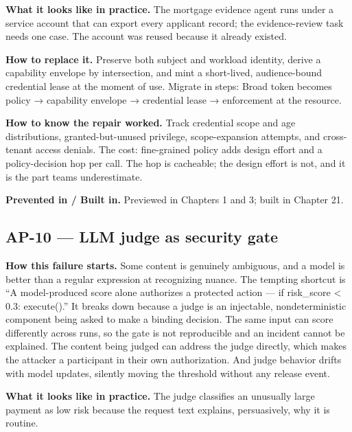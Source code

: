 \textbf{What it looks like in practice.} The mortgage evidence agent runs under a service account that can export every applicant record; the evidence-review task needs one case. The account was reused because it already existed.\par

\textbf{How to replace it.} Preserve both subject and workload identity, derive a capability envelope by intersection, and mint a short-lived, audience-bound credential lease at the moment of use. Migrate in steps: Broad token becomes policy → capability envelope → credential lease → enforcement at the resource.\par

\textbf{How to know the repair worked.} Track credential scope and age distributions, granted-but-unused privilege, scope-expansion attempts, and cross-tenant access denials. The cost: fine-grained policy adds design effort and a policy-decision hop per call. The hop is cacheable; the design effort is not, and it is the part teams underestimate.\par

\textbf{Prevented in / Built in.} Previewed in Chapters 1 and 3; built in Chapter 21.\par

\subsection{AP-10 — LLM judge as security gate}

\textbf{How this failure starts.} Some content is genuinely ambiguous, and a model is better than a regular expression at recognizing nuance. The tempting shortcut is “A model-produced score alone authorizes a protected action — if risk\_score < 0.3: execute().” It breaks down because a judge is an injectable, nondeterministic component being asked to make a binding decision. The same input can score differently across runs, so the gate is not reproducible and an incident cannot be explained. The content being judged can address the judge directly, which makes the attacker a participant in their own authorization. And judge behavior drifts with model updates, silently moving the threshold without any release event.\par

\textbf{What it looks like in practice.} The judge classifies an unusually large payment as low risk because the request text explains, persuasively, why it is routine.\par

